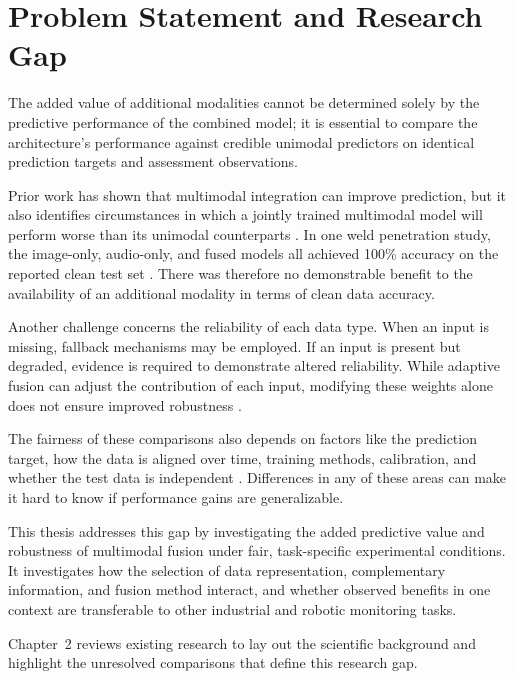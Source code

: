
\section{Problem Statement and Research Gap}

The added value of additional modalities cannot be determined
solely by the predictive performance of the combined model; it is
essential to compare the architecture's performance against
credible unimodal predictors on identical prediction targets
and assessment observations.

Prior work has shown that multimodal integration can improve
prediction, but it also identifies circumstances in which a jointly
trained multimodal model will perform worse than its unimodal
counterparts \citep{Wang2020What}. In one weld penetration study,
the image-only, audio-only, and fused models all achieved 100\%
accuracy on the reported clean test set
\citep[Tables~1--3]{Hua2026Weld}. There was therefore no demonstrable
benefit to the availability of an additional modality in terms
of clean data accuracy.

Another challenge concerns the reliability of each data type.
When an input is missing, fallback mechanisms may be employed.
If an input is present but degraded, evidence is required to
demonstrate altered reliability. While adaptive fusion can adjust
the contribution of each input, modifying these weights alone
does not ensure improved robustness \citep{Zhang2023QMF,P008}.

The fairness of these comparisons also depends on factors like
the prediction target, how the data is aligned over time, training
methods, calibration, and whether the test data is independent
\citep{P017,P004,Guo2017Calibration,P008}. Differences in any of
these areas can make it hard to know if performance gains are
generalizable.

This thesis addresses this gap by investigating the added predictive
value and robustness of multimodal fusion under fair, task-specific
experimental conditions. It investigates how the selection of data
representation, complementary information, and fusion method
interact, and whether observed benefits in one context are
transferable to other industrial and robotic monitoring tasks.

Chapter~2 reviews existing research to lay out the scientific
background and highlight the unresolved comparisons that define
this research gap.


